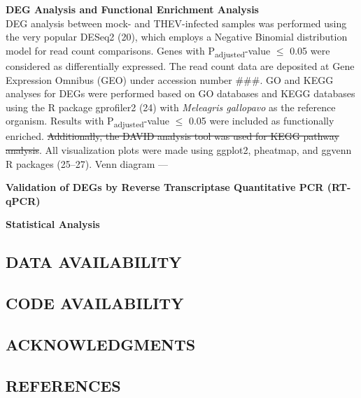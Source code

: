 \documentclass[
]{article}
\begin{document}
\textbf{DEG Analysis and Functional Enrichment Analysis}\\
DEG analysis between mock- and THEV-infected samples was performed using
the very popular DESeq2 (20), which employs a Negative Binomial
distribution model for read count comparisons. Genes with
P\textsubscript{adjusted}-value \(\leq\) 0.05 were considered as
differentially expressed. The read count data are deposited at Gene
Expression Omnibus (GEO) under accession number \#\#\#. GO and KEGG
analyses for DEGs were performed based on GO databases and KEGG
databases using the R package gprofiler2 (24) with \emph{Meleagris
gallopavo} as the reference organism. Results with
P\textsubscript{adjusted}-value \(\leq\) 0.05 were included as
functionally enriched. \st{Additionally, the DAVID analysis tool was
used for KEGG pathway analysis}. All visualization plots were made using
ggplot2, pheatmap, and ggvenn R packages (25--27). Venn diagram ---

\textbf{Validation of DEGs by Reverse Transcriptase Quantitative PCR
(RT-qPCR)}

\textbf{Statistical Analysis} \newpage

\subsection{DATA AVAILABILITY}\label{data-availability}

\newpage

\subsection{CODE AVAILABILITY}\label{code-availability}

\newpage

\subsection{ACKNOWLEDGMENTS}\label{acknowledgments}

\newpage

\subsection{REFERENCES}\label{references}

\setlength{\parindent}{-0.25in}
\setlength{\leftskip}{0.25in}

\noindent
\end{document}
